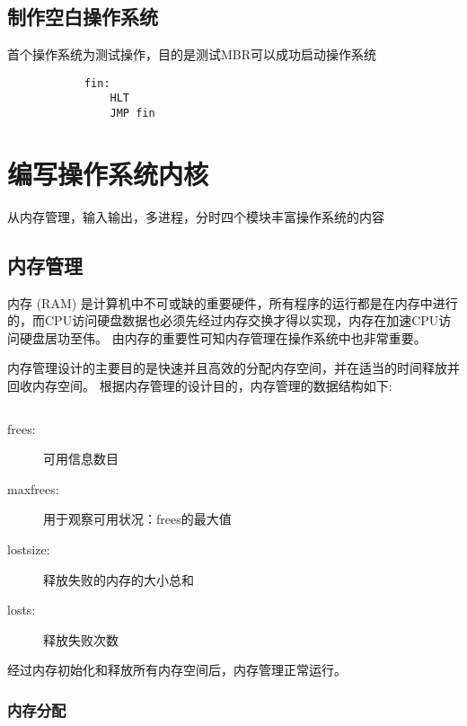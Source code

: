 \documentclass{swfcthesis}
\begin{document}
		\inputminted[tabsize=2, firstline=76, lastline=88,
		linenos=true]{nasm}{../ZOS/src/kernel/ipl09.nas}
	
	\begin{listing}[H]
		\inputminted[tabsize=2, firstline=125, lastline=147,
		linenos=true]{nasm}{../ZOS/src/kernel/ipl09.nas}
	\end{listing}

	\section{制作空白操作系统}
	首个操作系统为测试操作，目的是测试MBR可以成功启动操作系统
	\begin{verbatim}
			fin:
			    HLT
			    JMP fin
	\end{verbatim}
		
\chapter{编写操作系统内核}
	从内存管理，输入输出，多进程，分时四个模块丰富操作系统的内容
	\section{内存管理}
		内存 (RAM) 是计算机中不可或缺的重要硬件，所有程序的运行都是在内存中进行的，而CPU访问硬盘数据也必须先经过内存交换才得以实现，内存在加速CPU访问硬盘居功至伟。
		由内存的重要性可知内存管理在操作系统中也非常重要。	
		
		内存管理设计的主要目的是快速并且高效的分配内存空间，并在适当的时间释放并回收内存空间。
		根据内存管理的设计目的，内存管理的数据结构如下:
		\inputminted[tabsize=2, firstline=137, lastline=143,
		linenos=true]{c}{../ZOS/src/kernel/bootpack.h}
		
		\begin{description}
		\item[frees:]可用信息数目
		\item[maxfrees:]用于观察可用状况：frees的最大值
		\item[lostsize:]释放失败的内存的大小总和
		\item[losts:]释放失败次数
		\end{description}
		
		经过内存初始化和释放所有内存空间后，内存管理正常运行。
		
		\subsection{内存分配}
\end{document}

